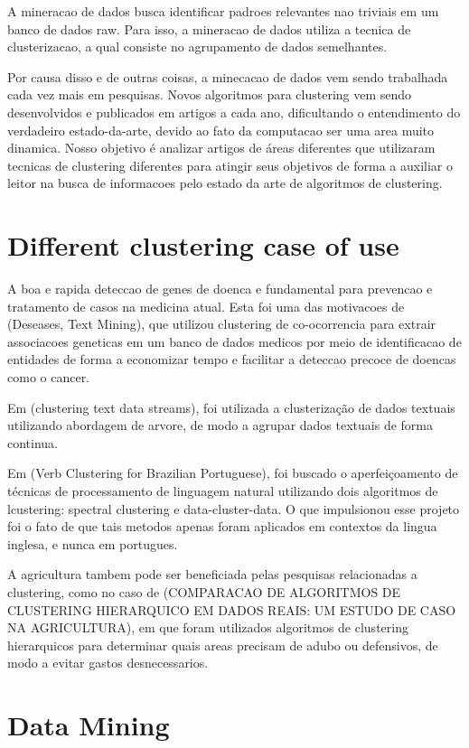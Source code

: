 \documentclass[12pt]{article}
\begin{document}
A mineracao de dados busca identificar padroes relevantes nao triviais em um banco de dados raw. Para isso, a mineracao de dados utiliza a tecnica de clusterizacao, a qual consiste no agrupamento de dados semelhantes.

Por causa disso e de outras coisas, a minecacao de dados vem sendo trabalhada cada vez mais em pesquisas. Novos algoritmos para clustering vem sendo desenvolvidos e publicados em artigos a cada ano, dificultando o entendimento do verdadeiro estado-da-arte, devido ao fato da computacao ser uma area muito dinamica. Nosso objetivo é analizar artigos de áreas diferentes que utilizaram tecnicas de clustering diferentes para atingir seus objetivos de forma a auxiliar o leitor na busca de informacoes pelo estado da arte de algoritmos de clustering.

\section{Different clustering case of use}

A boa e rapida deteccao de genes de doenca e fundamental para prevencao e tratamento de casos na medicina atual. Esta foi uma das motivacoes de (Deseases, Text Mining), que utilizou clustering de co-ocorrencia para extrair associacoes geneticas em um banco de dados medicos por meio de identificacao de entidades de forma a economizar tempo e facilitar a deteccao precoce de doencas como o cancer.

Em (clustering text data streams), foi utilizada a clusterização de dados textuais utilizando abordagem de arvore, de modo a agrupar dados textuais de forma continua.

Em (Verb Clustering for Brazilian Portuguese), foi buscado o aperfeiçoamento de técnicas de processamento de linguagem natural utilizando dois algoritmos de lcustering: spectral clustering e data-cluster-data. O que impulsionou esse projeto foi o fato de que tais metodos apenas foram aplicados em contextos da lingua inglesa, e nunca em portugues.


A agricultura tambem pode ser beneficiada pelas pesquisas relacionadas a clustering, como no caso de (COMPARACAO DE ALGORITMOS DE CLUSTERING HIERARQUICO EM DADOS REAIS: UM ESTUDO DE CASO NA AGRICULTURA), em que foram utilizados algoritmos de clustering hierarquicos para determinar quais areas precisam de adubo ou defensivos, de modo a evitar gastos desnecessarios.

\section{Data Mining}
\end{document}
